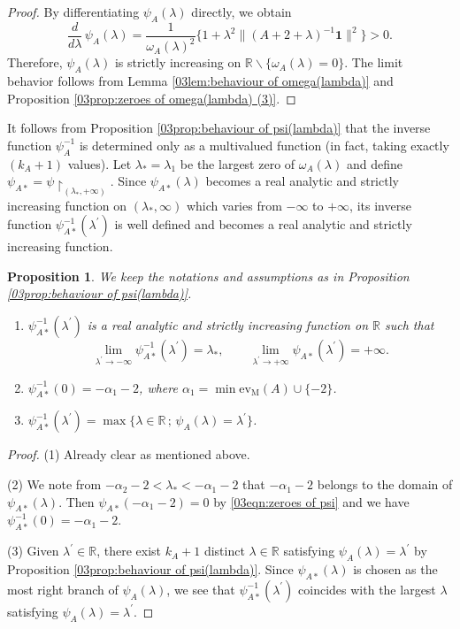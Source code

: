 \documentclass[12pt,a4paper]{article}
\newtheorem{proposition}[theorem]{Proposition}
\newcommand{\1}{{\bm 1}}
\numberwithin{equation}{section}
\begin{document}
\begin{proof}
By differentiating $\psi_A(\lambda)$ directly, we obtain
\[
\frac{d}{d\lambda}\,\psi_A(\lambda)
=\frac{1}{\omega_A(\lambda)^2}
  \Big\{1+\lambda^2\|(A+2+\lambda)^{-1}\mathbf{1}\|^2 \Big\}>0.
\]
Therefore, $\psi_A(\lambda)$ is 
strictly increasing on $\mathbb{R}\backslash\{\omega_A(\lambda)=0\}$.
The limit behavior follows from
Lemma \ref{03lem:behaviour of omega(lambda)} and
Proposition \ref{03prop:zeroes of omega(lambda) (3)}.
\end{proof}

It follows from Proposition \ref{03prop:behaviour of psi(lambda)} that
the inverse function $\psi_A^{-1}$ is determined only as
a multivalued function (in fact, taking exactly $(k_A+1)$ values).
Let $\lambda_*=\lambda_1$ be the largest zero of $\omega_A(\lambda)$
and define $\psi_{A*}=\psi\!\restriction_{(\lambda_*,+\infty)}$.
Since $\psi_{A*}(\lambda)$ becomes a real analytic
and strictly increasing function
on $(\lambda_*,\infty)$ which varies from $-\infty$ to $+\infty$,
its inverse function 
$\psi_{A*}^{-1}(\lambda^\prime)$ is well defined
and becomes a real analytic and strictly increasing function.


\begin{proposition}\label{03prop:behaviour of psi inverse}
We keep the notations and assumptions as in
Proposition \ref{03prop:behaviour of psi(lambda)}.
\begin{enumerate}
\item[\upshape (1)] $\psi_{A*}^{-1}(\lambda^\prime)$ 
is a real analytic and strictly increasing function
on $\mathbb{R}$ such that
\[
\lim_{\lambda^\prime\rightarrow-\infty} 
\psi_{A*}^{-1}(\lambda^\prime)=\lambda_*,
\qquad
\lim_{\lambda^\prime\rightarrow+\infty} 
\psi_{A*}(\lambda^\prime)=+\infty.
\]
\item[\upshape (2)] $\psi_{A*}^{-1}(0)=-\alpha_1-2$,
where $\alpha_1=\min \mathrm{ev}_{\mathrm{M}}(A)\cup\{-2\}$.
\item[\upshape (3)] 
$\psi_{A*}^{-1}(\lambda^\prime)
=\max \{\lambda\in\mathbb{R}\,;\, \psi_A(\lambda)=\lambda^\prime\}$.
\end{enumerate}
\end{proposition}

\begin{proof}
(1) Already clear as mentioned above.

(2) We note from $-\alpha_2-2<\lambda_*<-\alpha_1-2$ that
$-\alpha_1-2$ belongs to the domain of $\psi_{A*}(\lambda)$.
Then $\psi_{A*}(-\alpha_1-2)=0$ by \eqref{03eqn:zeroes of psi}
and we have $\psi_{A*}^{-1}(0)=-\alpha_1-2$.

(3) Given $\lambda^\prime\in\mathbb{R}$,
there exist $k_A+1$ distinct $\lambda\in \mathbb{R}$
satisfying $\psi_A(\lambda)=\lambda^\prime$ by
Proposition \ref{03prop:behaviour of psi(lambda)}.
Since $\psi_{A*}(\lambda)$ is chosen as the most right
branch of $\psi_A(\lambda)$,
we see that $\psi_{A*}^{-1}(\lambda^\prime)$ coincides with
the largest $\lambda$ satisfying $\psi_A(\lambda)=\lambda^\prime$.
\end{proof}
\end{document}

